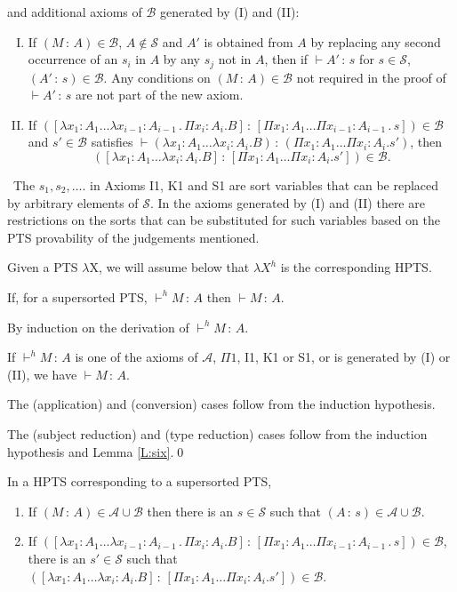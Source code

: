 \documentclass{LMCS}
\def\:{\mathbin{\,:\,}}
\def\.{\mathbin{\,.\,}}
\begin{document}
\begin{defi}
\noindent and additional axioms of $\mathcal B$ generated by (I) and
  (II):
\begin{enumerate}[(I)]
\item If $ (M\:A)\in\mathcal B$, $A\notin {\mathcal S}$ and $A'$ is
  obtained from $A$ by replacing any second occurrence of an $s_i$ in
  $A$ by any $s_j$ not in $A$, then if $\vdash A'\:s$ for $s\in
  {\mathcal S}$, $ (A'\:s)\in\mathcal B$. Any conditions on $(M\:A)
 \in\mathcal B$ not required in the proof of $\vdash A'\:s$ are not
  part of the new axiom.
\item If $([\lambda x_1{:}A_1\ldots\lambda x_{i-1}{:}A_{i-1}
 \.\Pi x_i{:}A_i.B]\:[\Pi x_1{:}A_1\ldots\Pi x_{i-1}{:}
  A_{i-1}\.s])\in\mathcal B$ and $s'\in\mathcal B$ satisfies
  $\vdash(\lambda x_1{:}A_1\ldots\lambda x_i{:}A_i.B)\:(\Pi x_1{:}A_1
 \ldots\Pi x_i{:}A_i .s')$, then
\[([\lambda x_1{:}A_1\ldots\lambda x_i{:}A_i.B]\:[\Pi x_1{:}A_1\ldots\Pi x_i{:}A_i.s'])\in {\mathcal B}.
\]
\end{enumerate}
\end{defi}

 \ The $s_1,s_2,\dots .$ in Axioms I1, K1 and S1 are
  sort variables that can be replaced by arbitrary elements of
  ${\mathcal S}$. In the axioms generated by (I) and (II) there are
  restrictions on the sorts that can be substituted for such variables
  based on the PTS provability of the judgements mentioned.

  Given a PTS $\lambda$X, we will assume below that $\lambda X^h$ is
  the corresponding HPTS.

\begin{thm}\label{T:seventeen} If, for a supersorted PTS, $\vdash^h
  M\:A$ then $\vdash M\:A$.
\end{thm}

\proof By induction on the derivation of  $\vdash^h M\:A$.

  If $\vdash^h M\:A$ is one of the axioms of $\mathcal A$, $\Pi1$, I1,
  K1 or S1, or is generated by (I) or (II), we have $\vdash M\:A$.

  The (application) and (conversion) cases follow from the induction
  hypothesis.

  The (subject reduction) and (type reduction) cases follow from the
  induction hypothesis and Lemma \ref{L:six}.\qed

\begin{lem}\label{L:eighteen} In a HPTS corresponding to a supersorted PTS,
\begin{enumerate}[\em(i)]
\item If $(M\:A)\in\mathcal A\cup\mathcal B$ then there is an $s
 \in\mathcal S$ such that $(A\:s)\in\mathcal A\cup\mathcal B$.
\item If $([\lambda x_1{:}A_1\ldots\lambda x_{i-1}{:}A_{i-1}
 \.\Pi x_i{:}A_i.B]\:[\Pi x_1{:}A_1\ldots\Pi x_{i-1}{:}
  A_{i-1}\.s])\in\mathcal B$, there is an $s'\in\mathcal S$
  such that $ ([\lambda x_1{:}A_1\ldots\lambda x_i{:}A_i.B]\:[\Pi
    x_1{:}A_1\ldots\Pi x_i{:}A_i .s'])\in\mathcal B$.
\end{enumerate}
\end{lem}
\end{document}
